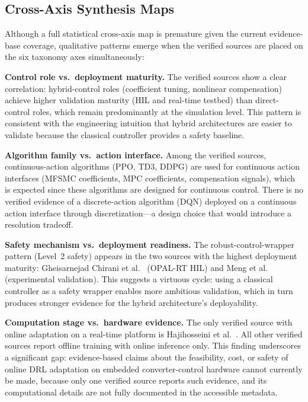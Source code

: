 \documentclass[manuscript,screen,review]{acmart}
\begin{document}
\subsection{Cross-Axis Synthesis Maps}

Although a full statistical cross-axis map is premature given the current evidence-base coverage, qualitative patterns emerge when the verified sources are placed on the six taxonomy axes simultaneously:

\textbf{Control role vs.\ deployment maturity.}
The verified sources show a clear correlation: hybrid-control roles (coefficient tuning, nonlinear compensation) achieve higher validation maturity (HIL and real-time testbed) than direct-control roles, which remain predominantly at the simulation level.
This pattern is consistent with the engineering intuition that hybrid architectures are easier to validate because the classical controller provides a safety baseline.

\textbf{Algorithm family vs.\ action interface.}
Among the verified sources, continuous-action algorithms (PPO, TD3, DDPG) are used for continuous action interfaces (MFSMC coefficients, MPC coefficients, compensation signals), which is expected since these algorithms are designed for continuous control.
There is no verified evidence of a discrete-action algorithm (DQN) deployed on a continuous action interface through discretization---a design choice that would introduce a resolution tradeoff.

\textbf{Safety mechanism vs.\ deployment readiness.}
The robust-control-wrapper pattern (Level~2 safety) appears in the two sources with the highest deployment maturity: Gheisarnejad Chirani et al.~\cite{gheisarnejad2022reducing} (OPAL-RT HIL) and Meng et al.~\cite{meng2022novel} (experimental validation).
This suggests a virtuous cycle: using a classical controller as a safety wrapper enables more ambitious validation, which in turn produces stronger evidence for the hybrid architecture's deployability.

\textbf{Computation stage vs.\ hardware evidence.}
The only verified source with online adaptation on a real-time platform is Hajihosseini et al.~\cite{hajihosseini2020dc}.
All other verified sources report offline training with online inference only.
This finding underscores a significant gap: evidence-based claims about the feasibility, cost, or safety of online DRL adaptation on embedded converter-control hardware cannot currently be made, because only one verified source reports such evidence, and its computational details are not fully documented in the accessible metadata.
\end{document}
